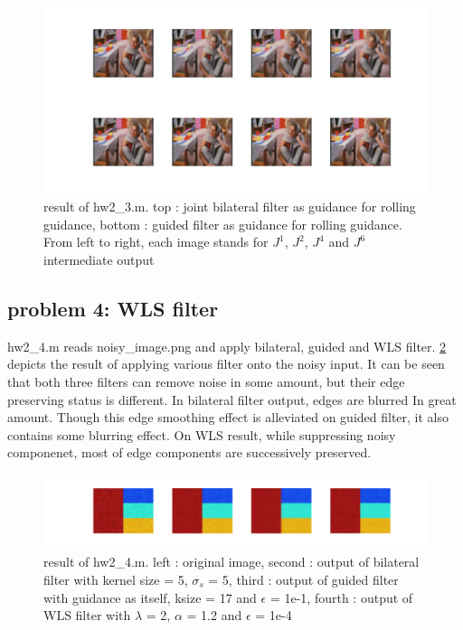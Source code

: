 \documentclass[extendedabs]{bmvc2k}
\begin{document}
\begin{figure}[h]
    \centering
    \includegraphics[width=\linewidth]{hw2_3_1}
    \caption{result of hw2\_3.m. top : joint bilateral filter as guidance for
    rolling guidance, bottom : guided filter as guidance for rolling guidance.
    From left to right, each image stands for $J^1$, $J^2$, $J^4$ and $J^6$
    intermediate output}
    \label{fig:10}
\end{figure}

\subsection*{problem 4: WLS filter}

hw2\_4.m reads noisy\_image.png and apply bilateral, guided and WLS filter. 
\figurename{\ref{fig:11}} depicts the result of applying various filter onto the noisy input. 
It can be seen that both three filters can remove noise in some amount, but their 
edge preserving status is different. In bilateral filter output, edges are blurred In
great amount. Though this edge smoothing effect is alleviated on guided filter, it also
contains some blurring effect. On WLS result, while suppressing noisy componenet, most of 
edge components are successively preserved.

\begin{figure}[h]
    \centering
    \includegraphics[width=\linewidth]{hw2_4_1}
    \caption{result of hw2\_4.m. left : original image, second : output of bilateral filter 
    with kernel size = 5, $\sigma_s$ = 5, third : output of guided filter with guidance as
    itself, ksize = 17 and $\epsilon$ = 1e-1, fourth : output of WLS filter with
    $\lambda$ = 2, $\alpha$ = 1.2 and $\epsilon$ = 1e-4}
    \label{fig:11}
\end{figure}
\end{document}
